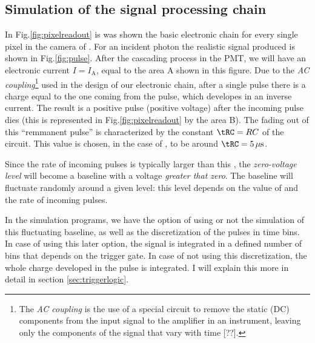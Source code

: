 \subsection{Simulation of the signal processing chain}

In Fig.\ref{fig:pixelreadout} is was shown the basic electronic chain
for every single pixel in the camera of \MAGIC. For an incident photon
the realistic signal produced is shown in Fig.\ref{fig:pulse}. After
the cascading process in the PMT, we will have an electronic current
$I=I_{\mathrm{A}}$, equal to the area A shown in this figure. Due to
the \emph{AC coupling}\footnote{The \emph{AC coupling} is the use of a
  special circuit to remove the static (DC) components from the input
  signal to the amplifier in an instrument, leaving only the
  components of the signal that vary with time [??].}
used in the design of our electronic chain, after a single pulse there
is a charge equal to the one coming from the pulse, which developes in
an inverse current. The result is a positive pulse (positive voltage)
after the incoming pulse dies (this is represented in
Fig.\ref{fig:pixelreadout} by the area B). The fading out of this
``remmanent pulse'' is characterized by the constant $\tRC=RC$ of the
circuit. This value is chosen, in the case of \MAGIC, to be around
$\tRC=5\,\mu\mathrm{s}$.

Since the rate of incoming pulses is typically larger than this \tRC,
the \emph{zero-voltage level} will become a baseline with a voltage
\emph{greater that zero}. The baseline will fluctuate randomly around
a given level: this level depends on the value of \tRC and the rate of
incoming pulses.

In the simulation programs, we have the option of using or not the
simulation of this fluctuating baseline, as well as the discretization
of the pulses in time bins. In case of using this later option, the
signal is integrated in a defined number of bins that depends on the
trigger gate. In case of not using this discretization, the whole
charge developed in the pulse is integrated. I will explain this more
in detail in section \ref{sec:triggerlogic}.

\pulsefig

